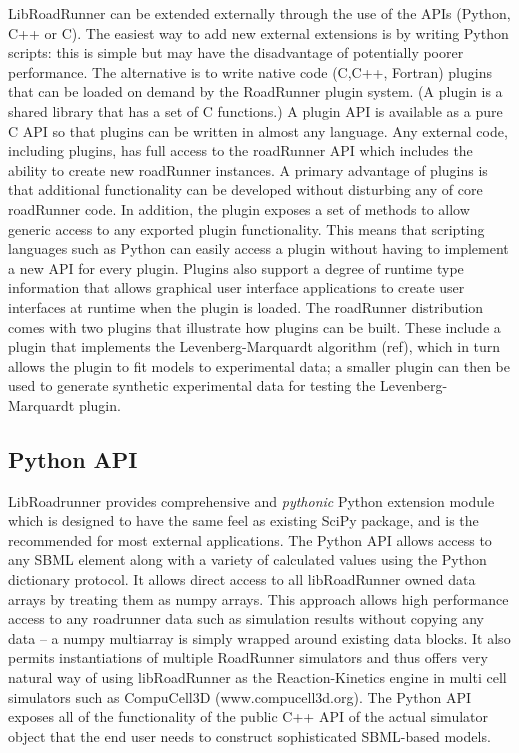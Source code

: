 \documentclass{bioinfo}
\begin{document}
\begin{methods}
LibRoadRunner can be extended externally through the use of the APIs (Python, C++ or C).  The easiest way to add new external extensions is by writing Python scripts: this is simple but may have the disadvantage of potentially poorer performance. The alternative is to write native code (C,C++, Fortran) plugins that can be loaded on demand by the RoadRunner plugin system.  (A plugin is a shared library that has a set of C functions.) A plugin API is available as a pure C API so that plugins can be written in almost any language.  Any external code, including plugins, has full access to the roadRunner API which includes the ability to create new roadRunner instances. A primary advantage of plugins is that additional functionality can be developed without disturbing any of core roadRunner code. In addition, the plugin exposes a set of methods to allow generic access to any exported plugin functionality. This means that scripting languages such as Python can easily access a plugin without having to implement a new API for every plugin. Plugins also support a degree of runtime type information that allows graphical user interface applications to create user interfaces at runtime when the plugin is loaded. The roadRunner distribution comes with two plugins that illustrate how plugins can be built. These include a plugin that implements the Levenberg-Marquardt algorithm (ref), which in turn allows the plugin to fit models to experimental data; a smaller plugin can then be used to generate synthetic experimental data for testing the Levenberg-Marquardt plugin.


\subsection{Python API}

LibRoadrunner provides comprehensive and \emph{pythonic} Python extension module which is designed to have the same feel as existing SciPy package, and is the recommended for most external applications. The Python API allows access to any SBML element along with a variety of calculated values using the Python dictionary protocol. It allows direct access to all libRoadRunner owned data arrays by treating them as numpy arrays. This approach allows high performance access to any roadrunner data such as simulation results without copying any data -- a numpy multiarray is simply wrapped around existing data blocks. It also permits instantiations of multiple RoadRunner simulators and thus offers very natural way of using libRoadRunner as the Reaction-Kinetics engine in multi cell simulators such as CompuCell3D (www.compucell3d.org). The Python API exposes all of the functionality of the public C++ API of the actual simulator object that the end user needs to construct sophisticated SBML-based models. 


\end{methods}
\end{document}
